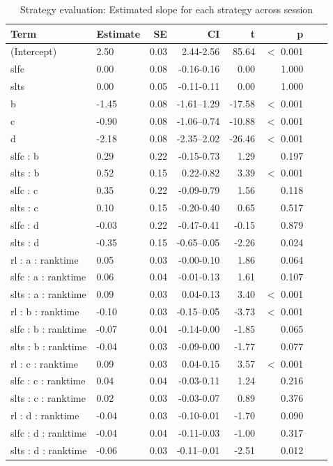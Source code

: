 \documentclass[pdflatex,sn-mathphys-num]{sn-jnl}%
\theoremstyle{thmstyleone}%
\theoremstyle{thmstyletwo}%
\theoremstyle{thmstylethree}%
\begin{document}
\begin{appendices}
\begin{table}[h!]
\caption{Strategy evaluation: Estimated slope for each strategy across session}\label{table_strategyevaluation_slopestrategy}
\centering
\begin{tabular}{llrrrrrr}
  \hline
 Term & Estimate & SE & CI & t & p \\ 
  \hline
(Intercept) & 2.50 & 0.03 & 2.44-2.56 & 85.64 &  $<$  0.001 \\ 
  slfc & 0.00 & 0.08 & -0.16-0.16 & 0.00 &    1.000 \\ 
  slts & 0.00 & 0.05 & -0.11-0.11 & 0.00 &    1.000 \\ 
  b & -1.45 & 0.08 & -1.61--1.29 & -17.58 &  $<$  0.001 \\ 
  c & -0.90 & 0.08 & -1.06--0.74 & -10.88 &  $<$  0.001 \\ 
  d & -2.18 & 0.08 & -2.35--2.02 & -26.46 &  $<$  0.001 \\ 
  slfc : b & 0.29 & 0.22 & -0.15-0.73 & 1.29 &    0.197 \\ 
  slts : b & 0.52 & 0.15 & 0.22-0.82 & 3.39 &  $<$  0.001 \\ 
  slfc : c & 0.35 & 0.22 & -0.09-0.79 & 1.56 &    0.118 \\ 
  slts : c & 0.10 & 0.15 & -0.20-0.40 & 0.65 &    0.517 \\ 
  slfc : d & -0.03 & 0.22 & -0.47-0.41 & -0.15 &    0.879 \\ 
  slts : d & -0.35 & 0.15 & -0.65--0.05 & -2.26 &    0.024 \\ 
rl : a : ranktime & 0.05 & 0.03 & -0.00-0.10 & 1.86 &    0.064 \\ 
slfc : a : ranktime & 0.06 & 0.04 & -0.01-0.13 & 1.61 &    0.107 \\ 
slts : a : ranktime & 0.09 & 0.03 & 0.04-0.13 & 3.40 &  $<$  0.001 \\ 
rl : b : ranktime & -0.10 & 0.03 & -0.15--0.05 & -3.73 &  $<$  0.001 \\ 
slfc : b : ranktime & -0.07 & 0.04 & -0.14-0.00 & -1.85 &    0.065 \\ 
slts : b : ranktime & -0.04 & 0.03 & -0.09-0.00 & -1.77 &    0.077 \\ 
rl : c : ranktime & 0.09 & 0.03 & 0.04-0.15 & 3.57 &  $<$  0.001 \\ 
slfc : c : ranktime & 0.04 & 0.04 & -0.03-0.11 & 1.24 &    0.216 \\ 
slts : c : ranktime & 0.02 & 0.03 & -0.03-0.07 & 0.89 &    0.376 \\ 
rl : d : ranktime & -0.04 & 0.03 & -0.10-0.01 & -1.70 &    0.090 \\ 
slfc : d : ranktime & -0.04 & 0.04 & -0.11-0.03 & -1.00 &    0.317 \\ 
slts : d : ranktime & -0.06 & 0.03 & -0.11--0.01 & -2.51 &    0.012 \\ 
   \hline
\end{tabular}
\end{table}




\end{appendices}
\end{document}

